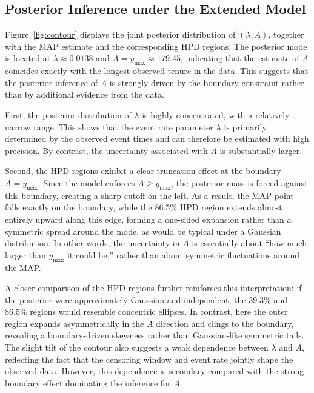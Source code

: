 \subsection{Posterior Inference under the Extended Model}
\label{res:post_contour}
Figure~\ref{fig:contour} displays the joint posterior distribution of $(\lambda, A)$, together with the MAP estimate and the corresponding HPD regions. The posterior mode is located at $\lambda \approx 0.0138$ and $A = y_{\max} \approx 179.45$, indicating that the estimate of $A$ coincides exactly with the longest observed tenure in the data. This suggests that the posterior inference of $A$ is strongly driven by the boundary constraint rather than by additional evidence from the data.

First, the posterior distribution of $\lambda$ is highly concentrated, with a relatively narrow range. This shows that the event rate parameter $\lambda$ is primarily determined by the observed event times and can therefore be estimated with high precision. By contrast, the uncertainty associated with $A$ is substantially larger.

Second, the HPD regions exhibit a clear truncation effect at the boundary $A = y_{\max}$. Since the model enforces $A \geq y_{\max}$, the posterior mass is forced against this boundary, creating a sharp cutoff on the left. As a result, the MAP point falls exactly on the boundary, while the 86.5\% HPD region extends almost entirely upward along this edge, forming a one-sided expansion rather than a symmetric spread around the mode, as would be typical under a Gaussian distribution. In other words, the uncertainty in $A$ is essentially about “how much larger than $y_{\max}$ it could be,” rather than about symmetric fluctuations around the MAP.

A closer comparison of the HPD regions further reinforces this interpretation: if the posterior were approximately Gaussian and independent, the 39.3\% and 86.5\% regions would resemble concentric ellipses. In contrast, here the outer region expands asymmetrically in the $A$ direction and clings to the boundary, revealing a boundary-driven skewness rather than Gaussian-like symmetric tails. The slight tilt of the contour also suggests a weak dependence between $\lambda$ and $A$, reflecting the fact that the censoring window and event rate jointly shape the observed data. However, this dependence is secondary compared with the strong boundary effect dominating the inference for $A$.

